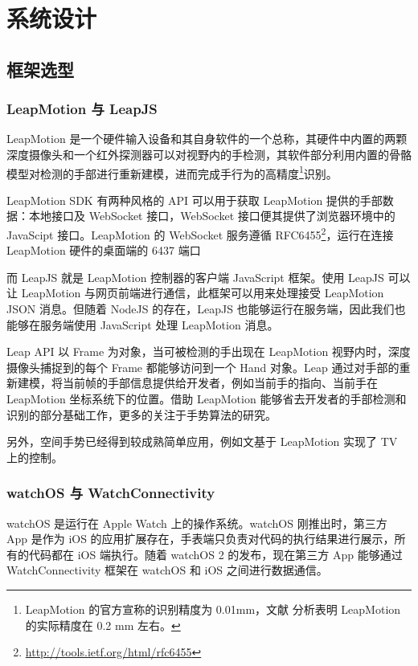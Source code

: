 \chapter{系统设计}

\section{框架选型}

\subsection{LeapMotion 与 LeapJS}

LeapMotion \cite{Leap:2016}是一个硬件输入设备和其自身软件的一个总称，其硬件中内置的两颗深度摄像头和一个红外探测器可以对视野内的手检测，其软件部分利用内置的骨骼模型对检测的手部进行重新建模，进而完成手行为的高精度\footnote{ LeapMotion 的官方宣称的识别精度为 0.01mm，文献\cite{weichert2013analysis, gdu2016} 分析表明 LeapMotion 的实际精度在 0.2 mm 左右。}识别。

LeapMotion SDK 有两种风格的 API 可以用于获取 LeapMotion 提供的手部数据：本地接口及 WebSocket 接口，WebSocket 接口便其提供了浏览器环境中的 JavaScipt 接口。LeapMotion 的 WebSocket 服务遵循 RFC6455\footnote{\url{http://tools.ietf.org/html/rfc6455}}，运行在连接 LeapMotion 硬件的桌面端的 6437 端口

而 LeapJS 就是 LeapMotion 控制器的客户端 JavaScript 框架。使用 LeapJS 可以让 LeapMotion 与网页前端进行通信，此框架可以用来处理接受 LeapMotion JSON 消息。但随着 NodeJS 的存在，LeapJS 也能够运行在服务端，因此我们也能够在服务端使用 JavaScript 处理 LeapMotion 消息。

Leap API 以 Frame 为对象，当可被检测的手出现在 LeapMotion 视野内时，深度摄像头捕捉到的每个 Frame 都能够访问到一个 Hand 对象。Leap 通过对手部的重新建模，将当前帧的手部信息提供给开发者，例如当前手的指向、当前手在 LeapMotion 坐标系统下的位置。借助 LeapMotion 能够省去开发者的手部检测和识别的部分基础工作，更多的关注于手势算法的研究\cite{garber2013gestural,xusuibin2015,panjiajia2015,huhong2015,marin2014hand}。

另外，空间手势已经得到较成熟简单应用，例如文\cite{zaicti2015free}基于 LeapMotion 实现了 TV 上的控制。

\subsection{watchOS 与 WatchConnectivity}

watchOS 是运行在 Apple Watch 上的操作系统。watchOS 刚推出时，第三方 App 是作为 iOS 的应用扩展存在，手表端只负责对代码的执行结果进行展示，所有的代码都在 iOS 端执行。随着 watchOS 2 的发布，现在第三方 App 能够通过 WatchConnectivity 框架在 watchOS 和 iOS 之间进行数据通信。

